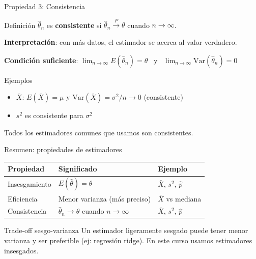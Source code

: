 \documentclass[aspectratio=169, 11pt]{beamer}
\begin{document}
\begin{frame}{Propiedad 3: Consistencia}
\begin{block}{Definición}
$\hat{\theta}_n$ es \textbf{consistente} si
$\hat{\theta}_n \xrightarrow{P} \theta$ cuando $n \to \infty$.
\end{block}

\textbf{Interpretación}: con más datos, el estimador se acerca al valor verdadero.

\textbf{Condición suficiente}: $\lim_{n \to \infty} E(\hat{\theta}_n) = \theta$ \ y \ $\lim_{n \to \infty} \text{Var}(\hat{\theta}_n) = 0$

\begin{exampleblock}{Ejemplos}
\begin{itemize}
\item $\bar{X}$: $E(\bar{X}) = \mu$ y $\text{Var}(\bar{X}) = \sigma^2/n \to 0$ \quad (consistente)
\item $s^2$ es consistente para $\sigma^2$
\end{itemize}
\end{exampleblock}

\alert{Todos los estimadores comunes que usamos son consistentes.}
\end{frame}

\begin{frame}{Resumen: propiedades de estimadores}
{\small
\begin{table}
\centering
\begin{tabular}{lp{5cm}l}
\toprule
\textbf{Propiedad} & \textbf{Significado} & \textbf{Ejemplo} \\
\midrule
Insesgamiento & $E(\hat{\theta}) = \theta$ & $\bar{X}$, $s^2$, $\hat{p}$ \\
Eficiencia & Menor varianza (más preciso) & $\bar{X}$ vs mediana \\
Consistencia & $\hat{\theta}_n \to \theta$ cuando $n\to\infty$ & $\bar{X}$, $s^2$, $\hat{p}$ \\
\bottomrule
\end{tabular}
\end{table}
}

\begin{alertblock}{Trade-off sesgo-varianza}
Un estimador ligeramente sesgado puede tener menor varianza y ser preferible (ej: regresión ridge). En este curso usamos estimadores insesgados.
\end{alertblock}
\end{frame}

\end{document}
